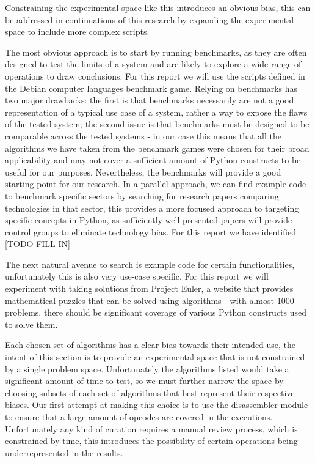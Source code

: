Constraining the experimental space like this introduces an obvious bias, this can be addressed in continuations of this
research by expanding the experimental space to include more complex scripts.

The most obvious approach is to start by running benchmarks, as they are often designed to test the limits of a system
and are likely to explore a wide range of operations to draw conclusions.
For this report we will use the scripts defined in the Debian computer languages benchmark game\cite{BenchmarkGame}.
Relying on benchmarks has two major drawbacks: the first is that benchmarks necessarily are not a good representation
of a typical use case of a system, rather a way to expose the flaws of the tested system; the second issue is that
benchmarks must be designed to be comparable across the tested systems - in our case this means that all the algorithms
we have taken from the benchmark games were chosen for their broad applicability and may not cover a sufficient amount
of Python constructs to be useful for our purposes.
Nevertheless, the benchmarks will provide a good starting point for our research.
In a parallel approach, we can find example code to benchmark specific sectors by searching for research papers
comparing technologies in that sector, this provides a more focused approach to targeting specific concepts in Python,
as sufficiently well presented papers will provide control groups to eliminate technology bias.
For this report we have identified [TODO FILL IN]

The next natural avenue to search is example code for certain functionalities, unfortunately this is also very use-case
specific.
For this report we will experiment with taking solutions from Project Euler\cite{ProjectEuler}, a website that provides
mathematical puzzles that can be solved using algorithms - with almost 1000 problems, there should be significant
coverage of various Python constructs used to solve them.

Each chosen set of algorithms has a clear bias towards their intended use, the intent of this section is to provide an
experimental space that is not constrained by a single problem space.
Unfortunately the algorithms listed would take a significant amount of time to test, so we must further narrow the space
by choosing subsets of each set of algorithms that best represent their respective biases.
Our first attempt at making this choice is to use the disassembler module to ensure that a large amount of opcodes are
covered in the executions.
Unfortunately any kind of curation requires a manual review process, which is constrained by time, this introduces the
possibility of certain operations being underrepresented in the results.

